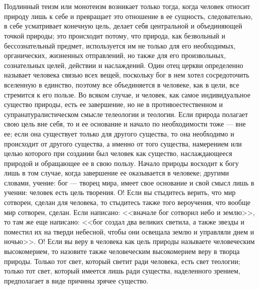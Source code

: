 \documentclass[12pt]{article}
\begin{document}
\section{}

Подлинный теизм или монотеизм возникает только тогда, когда человек относит природу лишь к себе и превращает это отношение в ее сущность, следовательно, в себе усматривает конечную цель, делает себя центральной и объединяющей точкой природы; это происходит потому, что природа, как безвольный и бессознательный предмет, используется им не только для его необходимых, органических, жизненных отправлений, но также для его произвольных, сознательных целей, действии и наслаждений. Один отец церкви определенно называет человека связью всех вещей, поскольку бог в нем хотел сосредоточить вселенную в единство, поэтому все объединяется в человеке, как в цели, все стремится к его пользе. Во всяком случае, и человек, как самое индивидуальное существо природы, есть ее завершение, но не в противоестественном и супранатуралистическом смысле телеологии и теологии. Если природа полагает свою цель вне себя, то и ее основание и начало по необходимости тоже --- вне ее; если она существует только для другого существа, то она необходимо и происходит от другого существа, а именно от того существа, намерением или целью которого при создании был человек как существо, наслаждающееся природой и обращающее ее в свою пользу. Начало природы восходит к богу лишь в том случае, когда завершение ее оказывается в человеке; другими словами, учение: бог --- творец мира, имеет свое основание и свой смысл лишь в учении: человек есть цель творения. О! Если вы стыдитесь верить, что мир сотворен, сделан для человека, то стыдитесь также того вероучения, что вообще мир сотворен, сделан. Если написано: <<вначале бог сотворил небо и землю>>, то там же еще написано: <<бог создал два великих светила, а также звезды и поместил их на тверди небесной, чтобы они освещала землю и управляли днем и ночью>>. О! Если вы веру в человека как цель природы называете человеческим высокомерием, то назовите также человеческим высокомерием веру в творца природы. Только тот свет, который светит ради человека, есть свет теологии; только тот свет, который имеется лишь ради существа, наделенного зрением, предполагает в виде причины зрячее существо.


\section{}
\end{document}
